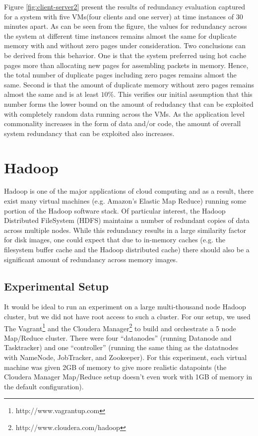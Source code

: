\documentclass{acm_proc_article-sp}
\begin{document}
Figure \ref{fig:client-server2} present the results of redundancy evaluation captured for a system with five VMs(four clients and one server) at time instances of 30 minutes apart. As can be seen from the figure, the values for redundancy across the system at different time instances remains almost the same for duplicate memory with and without zero pages under consideration. Two conclusions can be derived from this behavior. One is that the system preferred using hot cache pages more than allocating new pages for assembling packets in memory. Hence, the total number of duplicate pages including zero pages remains almost the same. Second is that the amount of duplicate memory without zero pages remains almost the same and is at least $10$\%. This verifies our initial assumption that this number forms the lower bound on the amount of redudancy that can be exploited with completely random data running across the VMs. As the application level commonality increases in the form of data and/or code, the amount of overall system redundancy that can be exploited also increases.


\section{Hadoop}
Hadoop is one of the major applications of cloud computing and as a result, there exist many virtual machines (e.g. Amazon's Elastic Map Reduce) running some portion of the Hadoop software stack.  Of particular interest, the Hadoop Distributed FileSystem (HDFS) maintains a number of redundant copies of data across multiple nodes.  While this redundancy results in a large similarity factor for disk images, one could expect that due to in-memory caches (e.g. the filesystem buffer cache and the Hadoop distributed cache) there should also be a significant amount of redundancy across memory images.  

\subsection{Experimental Setup}
It would be ideal to run an experiment on a  large multi-thousand node Hadoop cluster, but we did not have root access to such a cluster.  For our setup, we used The Vagrant\footnote{http://www.vagrantup.com} and the Cloudera Manager\footnote{http://www.cloudera.com/hadoop} to build and orchestrate a 5 node Map/Reduce cluster.  There were four ``datanodes'' (running Datanode and Tasktracker) and one ``controller'' (running the same thing as the datatnodes with NameNode, JobTracker, and Zookeeper).  For this experiment, each virtual machine was given 2GB of memory to give more realistic datapoints (the Cloudera Manager Map/Reduce setup doesn't even work with 1GB of memory in the default configuration).
\end{document}
